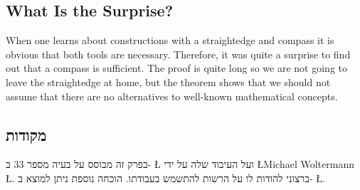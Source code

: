 
\subsection*{What Is the Surprise?}

When one learns about constructions with a straightedge and compass it is obvious that both tools are necessary. Therefore,  it was quite a surprise to find out that a compass is sufficient. The proof is quite long so we are not going to leave the straightedge at home, but the theorem shows that we should not assume that there are no alternatives to well-known mathematical concepts.



\subsection*{מקודות}

בפרק זה מבוסס על בעיה מספר
$33$
ב-%
\L{\cite{dorrie1}}
ועל העיבוד שלה על ידי
\L{Michael Woltermann} \L{\cite{dorrie2}}.%
ברצוני להודות לו על הרשות להתשמש בעבודתו.
הוכחה נוספת ניתן למוצא ב-%
\L{\cite{mm}}.
